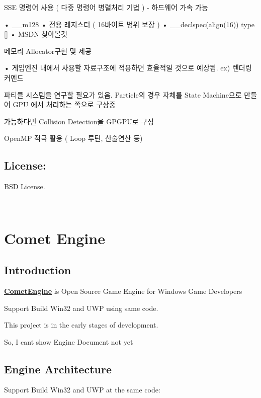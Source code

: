 S\+SE 명령어 사용 ( 다중 명령어 병렬처리 기법 ) -\/ 하드웨어 가속 가능 \begin{DoxyVerb}• __m128
• 전용 레지스터 ( 16바이트 범위 보장 )
• __declspec(align(16)) type []
• MSDN 찾아볼것
\end{DoxyVerb}


메모리 Allocator구현 및 제공 \begin{DoxyVerb}• 게임엔진 내에서 사용할 자료구조에 적용하면 효율적일 것으로 예상됨. ex) 렌더링 커멘드
\end{DoxyVerb}


파티클 시스템을 연구할 필요가 있음. Particle의 경우 자체를 State Machine으로 만들어 G\+PU 에서 처리하는 쪽으로 구상중

가능하다면 Collision Detection을 G\+P\+G\+P\+U로 구성

Open\+MP 적극 활용 ( Loop 루틴, 산술연산 등)

\subsection*{License\+:}

B\+SD License.

~\newline
 ~\newline
 



\section*{Comet Engine}

\subsection*{Introduction}

{\bfseries \hyperlink{namespace_comet_engine}{Comet\+Engine}} is Open Source Game Engine for Windows Game Developers

Support Build Win32 and U\+WP using same code.

This project is in the early stages of development.

So, I can\textquotesingle{}t show Engine Document not yet

\subsection*{Engine Architecture}

Support Build Win32 and U\+WP at the same code\+:

